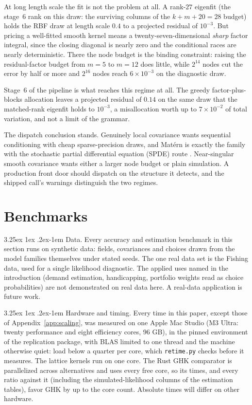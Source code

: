 \documentclass[11pt]{article}
\makeatletter
\renewcommand\paragraph{\@startsection{paragraph}{4}{\z@}%
  {3.25ex \@plus1ex \@minus.2ex}{-1em}%
  {\normalfont\normalsize\itshape}}
\makeatother
\begin{document}
At long length scale the fit is not the problem at all. A rank-$27$
eigenfit (the stage~6 rank on this draw: the surviving columns of the
$k+m+20=28$ budget) holds the RBF draw at length scale $0.4$ to a projected residual
of $10^{-3}$. But pricing a well-fitted smooth kernel means a
twenty-seven-dimensional \emph{sharp} factor integral, since the closing
diagonal is nearly zero and the conditional races are nearly
deterministic. There the node budget is the binding constraint:
raising the residual-factor budget from $m=5$ to $m=12$ does little,
while $2^{14}$ nodes cut the error by half or more
and $2^{16}$ nodes reach $6\times10^{-3}$ on the diagnostic draw.

Stage~6 of the pipeline is what reaches this regime at all. The greedy
factor-plus-blocks allocation leaves a projected residual of $0.14$ on
the same draw that the matched-rank eigenfit holds to $10^{-3}$, a
misallocation worth up to $7\times10^{-2}$ of total variation, and not a
limit of the grammar.

The dispatch conclusion stands. Genuinely local covariance wants
sequential conditioning with cheap sparse-precision draws, and Mat\'ern
is exactly the family with the stochastic partial differential equation (SPDE) route \citep{lindgren2011}.
Near-singular smooth covariance wants either a larger node budget or
plain simulation. A production front door should dispatch on the
structure it detects, and the shipped call's warnings distinguish the two
regimes.

\section{Benchmarks}\label{sec:num}

\paragraph{Data.} Every accuracy and estimation benchmark in this section
runs on synthetic data: fields, covariances and choices drawn from the
model families themselves under stated seeds. The one real data set is
the Fishing data, used for a single likelihood diagnostic. The applied
uses named in the introduction (demand estimation, handicapping,
portfolio weights read as choice probabilities) are not demonstrated on
real data here. A real-data application is future work.

\paragraph{Hardware and timing.} Every time in this paper, except those of Appendix~\ref{app:scaling}, was measured on
one Apple Mac Studio (M3 Ultra: twenty performance and eight efficiency
cores, 96 GB), in the pinned environment of the replication package, with
BLAS limited to one thread and the machine otherwise quiet: load below a
quarter per core, which \texttt{retime.py} checks before it measures. The
lattice kernels run on one core. The Rust GHK comparator is parallelized
across alternatives and uses every free core, so its times, and every
ratio against it (including the simulated-likelihood columns of the
estimation tables), favor GHK by up to the core count. Absolute times
will differ on other hardware.
\end{document}
